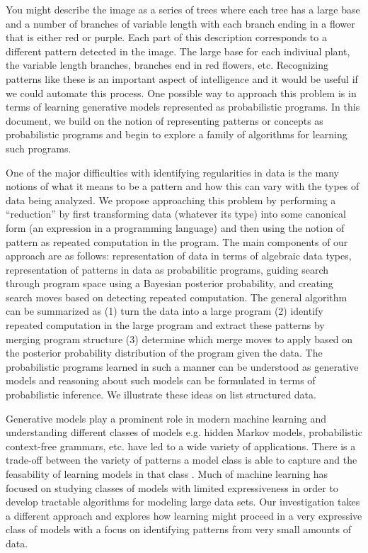 \documentclass[a4paper,10pt]{article}
\begin{document}
You might describe the image as a series of trees where each tree has a large base and a number of branches of variable length with each branch ending in a flower that is either red or purple.  Each part of this description corresponds to a different pattern detected in the image.  The large base for each indiviual plant, the variable length branches, branches end in red flowers, etc.  Recognizing patterns like these is an important aspect of intelligence and it would be useful if we could automate this process.  One possible way to approach this problem is in terms of learning generative models represented as probabilistic programs.  In this document, we build on the notion of representing patterns or concepts as probabilistic programs \cite{A.Stuhlmueller:2010:6d11a} and begin to explore a family of algorithms for learning such programs.

One of the major difficulties with identifying regularities in data is the many notions of what it means to be a pattern and how this can vary with the types of data being analyzed.   We propose approaching this problem by performing a ``reduction'' by first transforming data (whatever its type) into some canonical form (an expression in a programming language) and then using the notion of pattern as repeated computation in the program.  The main components of our approach are as follows: representation of data in terms of algebraic data types, representation of patterns in data as probabilitic programs, guiding search through program space using a Bayesian posterior probability, and creating search moves based on detecting repeated computation.  The general algorithm can be summarized as (1) turn the data into a large program (2) identify repeated computation in the large program and extract these patterns by merging program structure (3) determine which merge moves to apply based on the posterior probability distribution of the program given the data.  The probabilistic programs learned in such a manner can be understood as generative models and reasoning about such models can be formulated in terms of probabilistic inference.  We illustrate these ideas on list structured data.  

Generative models play a prominent role in modern machine learning and understanding different classes of models e.g. hidden Markov models, probabilistic context-free grammars, etc. have led to a wide variety of applications.  There is a trade-off between the variety of patterns a model class is able to capture and the feasability of learning models in that class \cite{Russell2003}.  Much of machine learning has focused on studying classes of models with limited expressiveness in order to develop tractable algorithms for modeling large data sets.  Our investigation takes a different approach and explores how learning might proceed in a very expressive class of models with a focus on identifying patterns from very small amounts of data.  
\end{document}
